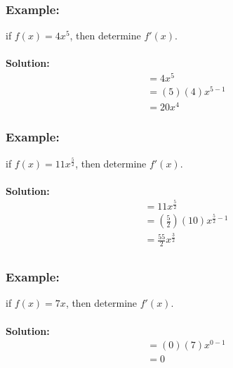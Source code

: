 \documentclass{article}
\begin{document}
\subsubsection*{Example:}
if $f(x)= 4x^5$, then determine $f'(x)$. \\ \\ 
\textbf{Solution:}
\begin{align*}
    &= 4x^5\\
    &= (5)(4)x^{5-1}\\
    &=20x^4
\end{align*}
\subsubsection*{Example:}
if $f(x)= 11x^{\frac{5}{2}}$, then determine $f'(x)$.\\ \\ 
\textbf{Solution:}
\begin{align*}
    &= 11x^{\frac{5}{2}}\\
    &= \left(\frac{5}{2}\right)(10)x^{\frac{5}{2}-1}\\
    &= \frac{55}{2}x^{\frac{3}{2}}\\
\end{align*}
\subsubsection*{Example:}
if $f(x)=7x$, then determine $f'(x)$.\\ \\ 
\textbf{Solution:}
\begin{align*}
    &=(0)(7)x^{0-1}\\
    &=0
\end{align*}
\newpage
\end{document}
